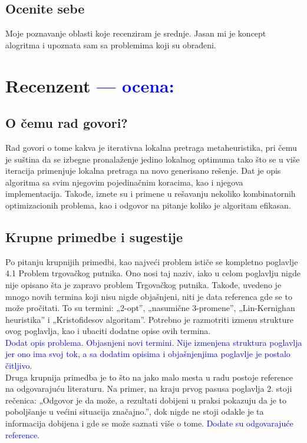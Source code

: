 \documentclass[a4paper]{report}
\newcommand{\odgovor}[1]{\textcolor{blue}{#1}}
\begin{document}
\section{Ocenite sebe}

Moje poznavanje oblasti koje recenziram je srednje. Jasan mi je koncept alogritma i upoznata sam sa problemima koji su obrađeni.


\chapter{Recenzent \odgovor{--- ocena:} }


\section{O čemu rad govori?}
Rad govori o tome kakva je iterativna lokalna pretraga metaheuristika, pri čemu je suština da se izbegne pronalaženje jedino lokalnog optimuma tako što se u više iteracija primenjuje lokalna pretraga na novo generisano rešenje. Dat je opis algoritma sa svim njegovim pojedinačnim koracima, kao i njegova implementacija. Takođe, iznete su i primene u rešavanju nekoliko kombinatornih optimizacionih problema, kao i odgovor na pitanje koliko je algoritam efikasan.

\section{Krupne primedbe i sugestije}
Po pitanju krupnijih primedbi, kao najveći problem ističe se kompletno poglavlje 4.1 Problem trgovačkog putnika. Ono nosi taj naziv, iako u celom poglavlju nigde nije opisano šta je zapravo problem Trgovačkog putnika. Takođe, uvedeno je mnogo novih termina koji nisu nigde objašnjeni, niti je data referenca gde se to može pročitati. To su termini: „2-opt”, „nasumične 3-promene”, „Lin-Kernighan heuristika” i „Kristofidesov algoritam”. Potrebno je razmotriti izmenu strukture ovog poglavlja, kao i ubaciti dodatne opise ovih termina.\\
\odgovor{Dodat opis problema. Objasnjeni novi termini. Nije izmenjena struktura poglavlja jer ono ima svoj tok, a sa dodatim opisima i objašnjenjima poglavlje je postalo čitljivo.\\}
Druga krupnija primedba je to što na jako malo mesta u radu postoje reference na odgovarajuću literaturu. Na primer, na kraju prvog pasusa poglavlja 2. stoji rečenica: „Odgovor je da može, a rezultati dobijeni u praksi pokazuju da je to poboljšanje u većini situacija značajno.”, dok nigde ne stoji odakle je ta informacija dobijena i gde se može saznati više o tome. \newline
\odgovor{Dodate su odgovarajuće reference.\\}
\end{document}
